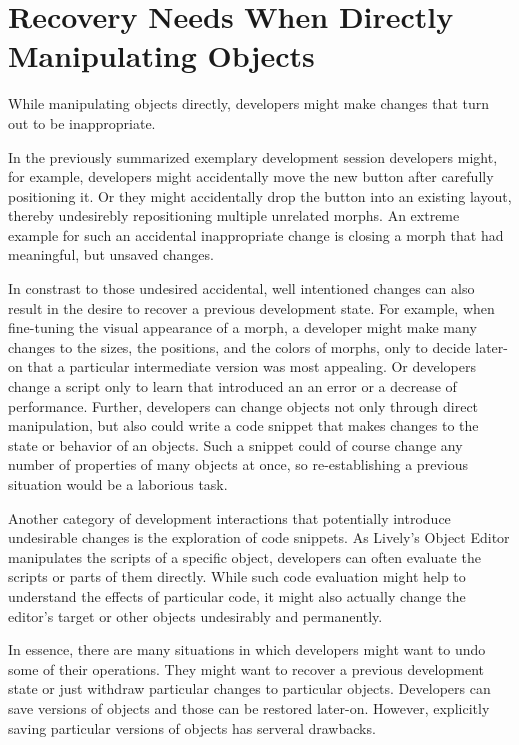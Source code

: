 

\section{Recovery Needs When Directly Manipulating Objects}

While manipulating objects directly, developers might make changes that turn out to be inappropriate.

In the previously summarized exemplary development session developers might, for example, developers might accidentally move the new button after carefully positioning it.
Or they might accidentally drop the button into an existing layout, thereby undesirebly repositioning multiple unrelated morphs.
An extreme example for such an accidental inappropriate change is closing a morph that had meaningful, but unsaved changes.

In constrast to those undesired accidental, well intentioned changes can also result in the desire to recover a previous development state.
For example, when fine-tuning the visual appearance of a morph, a developer might make many changes to the sizes, the positions, and the colors of morphs, only to decide later-on that a particular intermediate version was most appealing.
Or developers change a script only to learn that introduced an an error or a decrease of performance.
Further, developers can change objects not only through direct manipulation, but also could write a code snippet that makes changes to the state or behavior of an objects.
Such a snippet could of course change any number of properties of many objects at once, so re-establishing a previous situation would be a laborious task.

Another category of development interactions that potentially introduce undesirable changes is the exploration of code snippets.
As Lively's Object Editor manipulates the scripts of a specific object, developers can often evaluate the scripts or parts of them directly.
While such code evaluation might help to understand the effects of particular code, it might also actually change the editor's target or other objects undesirably and permanently.

In essence, there are many situations in which developers might want to undo some of their operations.
They might want to recover a previous development state or just withdraw particular changes to particular objects.
Developers can save versions of objects and those can be restored later-on.
However, explicitly saving particular versions of objects has serveral drawbacks.

